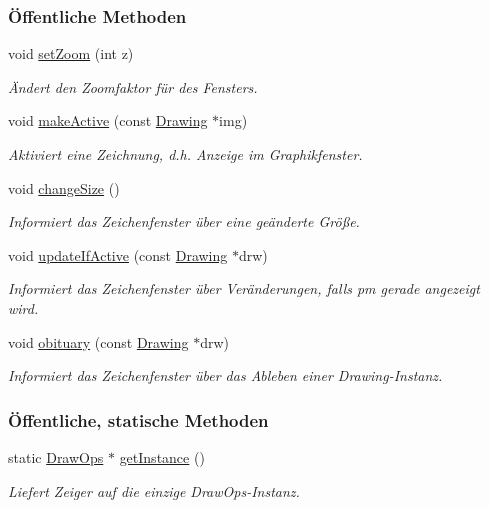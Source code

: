 \subsubsection*{Öffentliche Methoden}
\begin{DoxyCompactItemize}
\item 
void \mbox{\hyperlink{classDrawOps_a5a33052c26c6047d4d8bf839a97b92ac}{set\+Zoom}} (int z)
\begin{DoxyCompactList}\small\item\em Ändert den Zoomfaktor für des Fensters. \end{DoxyCompactList}\item 
void \mbox{\hyperlink{classDrawOps_a541a9b86fdabf35209d6fe1a7bccb8b8}{make\+Active}} (const \mbox{\hyperlink{classDrawing}{Drawing}} $\ast$img)
\begin{DoxyCompactList}\small\item\em Aktiviert eine Zeichnung, d.\+h. Anzeige im Graphikfenster. \end{DoxyCompactList}\item 
void \mbox{\hyperlink{classDrawOps_a4c0713f93d8f4131ff00e462d501c055}{change\+Size}} ()
\begin{DoxyCompactList}\small\item\em Informiert das Zeichenfenster über eine geänderte Größe. \end{DoxyCompactList}\item 
void \mbox{\hyperlink{classDrawOps_aa0374dd23672c7313f0798172e5a3523}{update\+If\+Active}} (const \mbox{\hyperlink{classDrawing}{Drawing}} $\ast$drw)
\begin{DoxyCompactList}\small\item\em Informiert das Zeichenfenster über Veränderungen, falls {\ttfamily pm} gerade angezeigt wird. \end{DoxyCompactList}\item 
void \mbox{\hyperlink{classDrawOps_a716f5c70f8b32a6e1a76437d5c3a346b}{obituary}} (const \mbox{\hyperlink{classDrawing}{Drawing}} $\ast$drw)
\begin{DoxyCompactList}\small\item\em Informiert das Zeichenfenster über das Ableben einer Drawing-\/\+Instanz. \end{DoxyCompactList}\end{DoxyCompactItemize}
\subsubsection*{Öffentliche, statische Methoden}
\begin{DoxyCompactItemize}
\item 
static \mbox{\hyperlink{classDrawOps}{Draw\+Ops}} $\ast$ \mbox{\hyperlink{classDrawOps_a2f59844de416f8d3ca4a2a63ccefb0cd}{get\+Instance}} ()
\begin{DoxyCompactList}\small\item\em Liefert Zeiger auf die einzige Draw\+Ops-\/\+Instanz. \end{DoxyCompactList}\end{DoxyCompactItemize}
